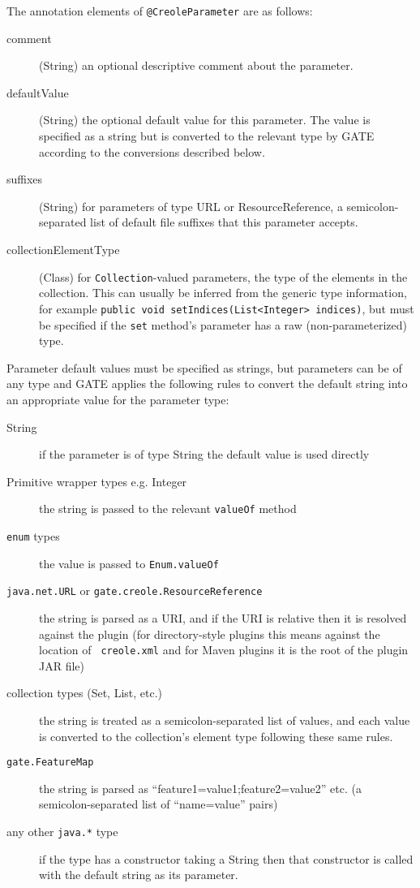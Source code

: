 The annotation elements of \verb|@CreoleParameter| are as follows:
\begin{description}
\item[comment] (String) an optional descriptive comment about the parameter.
\item[defaultValue] (String) the optional default value for this parameter.
  The value is specified as a string but is converted to the relevant type by
  GATE according to the conversions described below.
\item[suffixes] (String) for parameters of type URL or ResourceReference, a
  semicolon-separated list of default file suffixes that this parameter accepts.
\item[collectionElementType] (Class) for {\tt Collection}-valued parameters,
  the type of the elements in the collection.  This can usually be inferred
  from the generic type information, for example
  \verb|public void setIndices(List<Integer> indices)|, but must be specified
  if the {\tt set} method's parameter has a raw (non-parameterized) type.
\end{description}

Parameter default values must be specified as strings, but parameters can be of
any type and GATE applies the following rules to convert the default string
into an appropriate value for the parameter type:

\begin{description}
\item[String] if the parameter is of type String the default value is used
  directly
\item[Primitive wrapper types e.g. Integer] the string is passed to the
  relevant {\tt valueOf} method
\item[{\tt enum} types] the value is passed to {\tt Enum.valueOf}
\item[{\tt java.net.URL} or {\tt gate.creole.ResourceReference}] the string is
  parsed as a URI, and if the URI is relative then it is resolved against the
  plugin (for directory-style plugins this means against the location of {\tt
  creole.xml} and for Maven plugins it is the root of the plugin JAR file)
\item[collection types (Set, List, etc.)] the string is treated as a
  semicolon-separated list of values, and each value is converted to the
  collection's element type following these same rules.
\item[{\tt gate.FeatureMap}] the string is parsed as
  ``feature1=value1;feature2=value2'' etc. (a semicolon-separated list of
  ``name=value'' pairs)
\item[any other {\tt java.*} type] if the type has a constructor taking a
  String then that constructor is called with the default string as its
  parameter.
\end{description}

